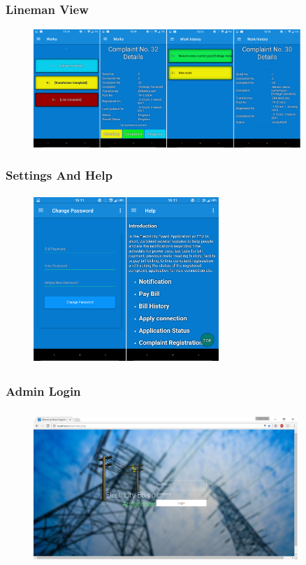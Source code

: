 \documentclass{beamer} %
\theoremstyle{definition} %
\begin{document}
\begin{frame}
\frametitle{Lineman View}
\begin{figure}[center]
\includegraphics[width=10.1cm ,height=4.5cm]{linehome.jpg} 
\end{figure}
\end{frame}

\begin{frame}
\frametitle{Settings And Help}
\begin{figure}[center]
\includegraphics[width=7cm ,height=6.4cm]{helppass.jpg} 
\end{figure}
\end{frame}

\begin{frame}
\frametitle{Admin Login}
\begin{figure}[center]
\includegraphics[width=10cm ,height=5.9cm]{index.png} 
\end{figure}
\end{frame}
\end{document}
